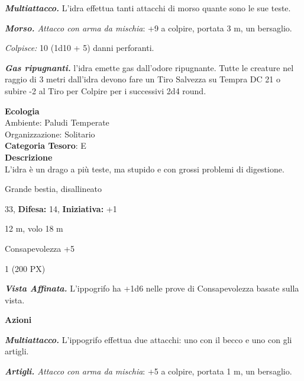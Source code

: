 \begin{multicols}{2}
{\emph{\textbf{Multiattacco.}} L'idra effettua tanti attacchi di morso quante sono le sue teste.

\emph{\textbf{Morso.} Attacco con arma da mischia}: +9 a colpire, portata 3 m, un bersaglio.

\emph{Colpisce:} 10 (1d10 + 5) danni perforanti.

\emph{\textbf{Gas ripugnanti.}} l'idra emette gas dall'odore ripugnante. Tutte le creature nel raggio di 3 metri dall'idra devono fare un Tiro Salvezza su Tempra DC 21 o subire -2 al Tiro per Colpire per i successivi 2d4 round.

\textbf{Ecologia}\\
Ambiente: Paludi Temperate\\
Organizzazione: Solitario\\
\textbf{Categoria Tesoro}: E\\
\textbf{Descrizione}\\
L'idra è un drago a più teste, ma stupido e con grossi problemi di digestione.


\noindent
\begin{description}[noitemsep, topsep=0pt, parsep=0pt, partopsep=0pt, leftmargin=0cm, labelwidth=2.2cm]
	\item[\textbf{Taglia/Tipo:}] Grande bestia, disallineato
	\item[\textbf{Caratt.:}] 
	\item[\textbf{Punti Ferita:}] 33,  \textbf{Difesa:} 14,  \textbf{Iniziativa:} +1
	\item[\textbf{Movimento:}] 12 m, volo 18 m
	\item[\textbf{Tiri Salvez.:}] 
	\item[\textbf{Comp.:}] Consapevolezza +5
	\item[\textbf{Sfida:}] 1 (200 PX)\smallskip
\end{description}

\emph{\textbf{Vista Affinata.}} L'ippogrifo ha +1d6 nelle prove di Consapevolezza basate sulla vista.

\textbf{Azioni}

\emph{\textbf{Multiattacco.}} L'ippogrifo effettua due attacchi: uno con il becco e uno con gli artigli.

\emph{\textbf{Artigli.} Attacco con arma da mischia}: +5 a colpire, portata 1 m, un bersaglio.

}
\end{multicols}
